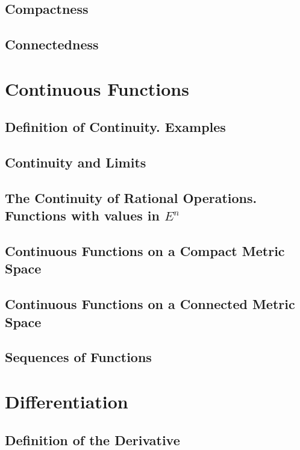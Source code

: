 \documentclass{article}
\theoremstyle{definition}
\theoremstyle{theorem}
\begin{document}
		\subsection{Compactness}
		
		\subsection{Connectedness}
	
	\section{Continuous Functions}
		\subsection{Definition of Continuity. Examples}
		
		\subsection{Continuity and Limits}
		
		\subsection{The Continuity of Rational Operations. Functions with values in $E^n$}
		
		\subsection{Continuous Functions on a Compact Metric Space}
		
		\subsection{Continuous Functions on a Connected Metric Space}
		
		\subsection{Sequences of Functions}
	
	\section{Differentiation}
		\subsection{Definition of the Derivative}
		
\end{document}
